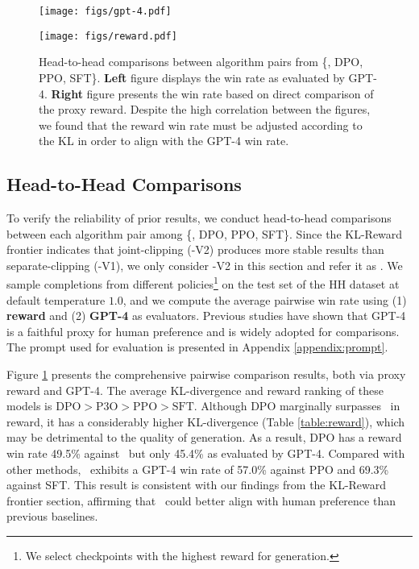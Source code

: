 \documentclass{article} %
\newcommand{\algn}{\text{P3O}}
\begin{document}
\begin{figure}[t]
  \centering
    \begin{minipage}[b]{0.5\textwidth}
    \texttt{[image: figs/gpt-4.pdf]}
  \end{minipage}\hspace{-10pt}
  \begin{minipage}[b]{0.5\textwidth}
    \texttt{[image: figs/reward.pdf]}
  \end{minipage}
    \caption{Head-to-head comparisons between algorithm pairs from \{\algn, DPO, PPO, SFT\}. \textbf{Left} figure displays the win rate as evaluated by GPT-4. \textbf{Right} figure presents the win rate based on direct comparison of the proxy reward. Despite the high correlation between the figures, we found that the reward win rate must be adjusted according to the KL in order to align with the GPT-4 win rate.}
    \label{figure:gpt4eval}
    \vspace*{-15pt}
\end{figure}

\subsection{Head-to-Head Comparisons} 
To verify the reliability of prior results, we conduct head-to-head comparisons between each algorithm pair among \{\algn, DPO, PPO, SFT\}. 
Since the KL-Reward frontier indicates that joint-clipping (\algn-V2) produces more stable results than separate-clipping (\algn-V1), we only consider \algn-V2 in this section and refer it as \algn. 
We sample completions from different policies\footnote{We select checkpoints with the highest reward for generation.} on the test set of the HH dataset at default temperature $1.0$, and we compute the average pairwise win rate using (1) \textbf{reward} and (2) \textbf{GPT-4} as evaluators. Previous studies \citep{chen2023exploring, rafailov2023direct} have shown that GPT-4 is a faithful proxy for human preference and is widely adopted for comparisons. The prompt used for evaluation is presented in Appendix \ref{appendix:prompt}.

Figure \ref{figure:gpt4eval} presents the comprehensive pairwise comparison results, both via proxy reward and GPT-4. The average KL-divergence and reward ranking of these models is $\text{DPO} > \algn > \text{PPO} > \text{SFT}$. Although DPO marginally surpasses \algn\ in reward, it has a considerably higher KL-divergence (Table \ref{table:reward}), which may be detrimental to the quality of generation. As a result, DPO has a reward win rate 49.5\% against \algn\, but only 45.4\% as evaluated by GPT-4. Compared with other methods, \algn\ exhibits a GPT-4 win rate of 57.0\% against PPO and 69.3\% against SFT. This result is consistent with our findings from the KL-Reward frontier section, affirming that \algn\ could better align with human preference than previous baselines.
\end{document}

